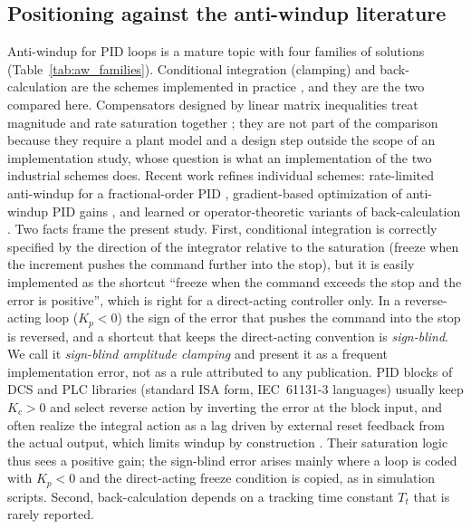 \subsection{Positioning against the anti-windup literature}
\label{subsec:positioning}
Anti-windup for PID loops is a mature topic with four families of solutions (Table~\ref{tab:aw_families}). Conditional integration (clamping) and back-calculation are the schemes implemented in practice \cite{astrom1989windup, hippe2006windup, peng1996nonlinear, bohn1995analysis}, and they are the two compared here. Compensators designed by linear matrix inequalities treat magnitude and rate saturation together \cite{galeani2009tutorial, tarbouriech2009antiwindup, lerch2021antiwindup}; they are not part of the comparison because they require a plant model and a design step outside the scope of an implementation study, whose question is what an implementation of the two industrial schemes does. Recent work refines individual schemes: rate-limited anti-windup for a fractional-order PID \cite{wang2020rate}, gradient-based optimization of anti-windup PID gains \cite{aksland2022gradient}, and learned or operator-theoretic variants of back-calculation \cite{serrano2024neuron, morohoshi2025nonlinear}. Two facts frame the present study. First, conditional integration is correctly specified by the direction of the integrator relative to the saturation (freeze when the increment pushes the command further into the stop), but it is easily implemented as the shortcut ``freeze when the command exceeds the stop and the error is positive'', which is right for a direct-acting controller only. In a reverse-acting loop ($K_p < 0$) the sign of the error that pushes the command into the stop is reversed, and a shortcut that keeps the direct-acting convention is \emph{sign-blind}. We call it \emph{sign-blind amplitude clamping} and present it as a frequent implementation error, not as a rule attributed to any publication. PID blocks of DCS and PLC libraries (standard ISA form, IEC~61131-3 languages) usually keep $K_c > 0$ and select reverse action by inverting the error at the block input, and often realize the integral action as a lag driven by external reset feedback from the actual output, which limits windup by construction \cite{shinskey1996process, astrom2006pid}. Their saturation logic thus sees a positive gain; the sign-blind error arises mainly where a loop is coded with $K_p < 0$ and the direct-acting freeze condition is copied, as in simulation scripts. Second, back-calculation depends on a tracking time constant $T_t$ that is rarely reported.

